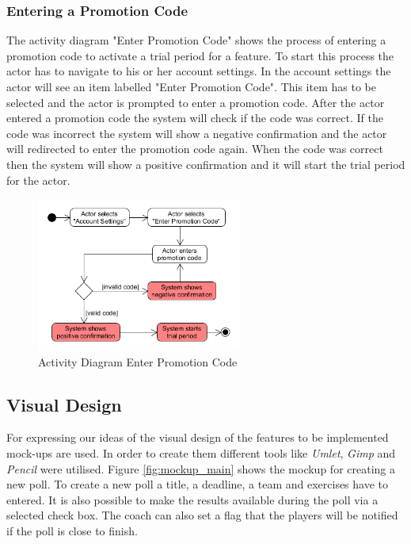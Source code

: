\subsubsection{Entering a Promotion Code}
\label{sssec:entering_promotion_code}
The activity diagram "Enter Promotion Code" shows the process of entering a promotion code to activate a trial period for a feature. To start this process the actor has to navigate to his or her account settings. In the account settings the actor will see an item labelled "Enter Promotion Code". This item has to be selected and the actor is prompted to enter a promotion code. After the actor entered a promotion code the system will check if the code was correct. If the code was incorrect the system will show a negative confirmation and the actor will redirected to enter the promotion code again. When the code was correct then the system will show a positive confirmation and it will start the trial period for the actor.

\begin{figure}[H]
    \begin{center}
        \includegraphics[width=0.6\textwidth]{images/diagrams/activity_diagrams/ActivityDiagram_EnterPromotionCode.png}
        \caption{Activity Diagram Enter Promotion Code}
        \label{fig:activity_diagram_enter_promotion_code}
    \end{center}
\end{figure}

\subsection{Visual Design}
\label{ssec:visual_design}

For expressing our ideas of the visual design of the features to be implemented mock-ups are used. In order to create them different tools like \textit{Umlet}, \textit{Gimp} and \textit{Pencil} were utilised.
\newline
Figure \ref{fig:mockup_main} shows the mockup for creating a new poll. To create a new poll a title, a deadline, a team and exercises have to entered. It is also possible to make the results available during the poll via a selected check box. The coach can also set a flag that the players will be notified if the poll is close to finish.  

